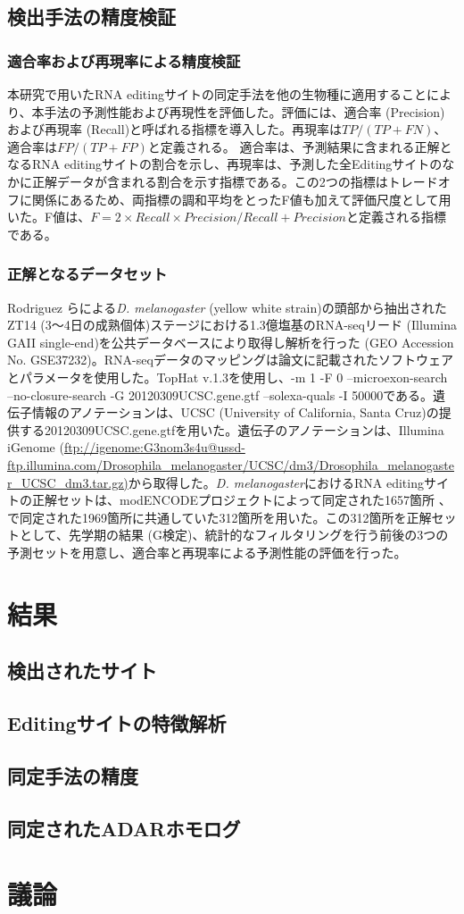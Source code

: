 \subsection{検出手法の精度検証}
\subsubsection{適合率および再現率による精度検証}
本研究で用いたRNA editingサイトの同定手法を他の生物種に適用することにより、本手法の予測性能および再現性を評価した。評価には、適合率 (Precision)および再現率 (Recall)と呼ばれる指標を導入した。再現率は$TP/(TP+FN)$、適合率は$FP/(TP+FP)$と定義される。 適合率は、予測結果に含まれる正解となるRNA editingサイトの割合を示し、再現率は、予測した全Editingサイトのなかに正解データが含まれる割合を示す指標である。この2つの指標はトレードオフに関係にあるため、両指標の調和平均をとったF値も加えて評価尺度として用いた。F値は、$F=2 \times Recall \times Precision/Recall+Precision$と定義される指標である。

\subsubsection{正解となるデータセット}
Rodriguez \citep{pmid22658416}らによる{\it D. melanogaster} (yellow white strain)の頭部から抽出されたZT14 (3〜4日の成熟個体)ステージにおける1.3億塩基のRNA-seqリード (Illumina GAII single-end)を公共データベースにより取得し解析を行った (GEO Accession No. GSE37232)。RNA-seqデータのマッピングは論文に記載されたソフトウェアとパラメータを使用した。TopHat v.1.3を使用し、-m 1 -F 0 --microexon-search --no-closure-search -G 20120309UCSC.gene.gtf --solexa-quals -I 50000である。遺伝子情報のアノテーションは、UCSC (University of California, Santa Cruz)の提供する20120309UCSC.gene.gtfを用いた。遺伝子のアノテーションは、Illumina iGenome (\url {ftp://igenome:G3nom3s4u@ussd-ftp.illumina.com/Drosophila_melanogaster/UCSC/dm3/Drosophila_melanogaster_UCSC_dm3.tar.gz)}から取得した。{\it D. melanogaster}におけるRNA editingサイトの正解セットは、modENCODEプロジェクトによって同定された1657箇所 \citep{pmid21179090}、\citep{pmid22658416}で同定された1969箇所に共通していた312箇所を用いた。この312箇所を正解セットとして、先学期の結果 (G検定)、統計的なフィルタリングを行う前後の3つの予測セットを用意し、適合率と再現率による予測性能の評価を行った。


\section{結果}
\subsection{検出されたサイト}
\subsection{Editingサイトの特徴解析}
\subsection{同定手法の精度}
\subsection{同定されたADARホモログ}

\section{議論}
